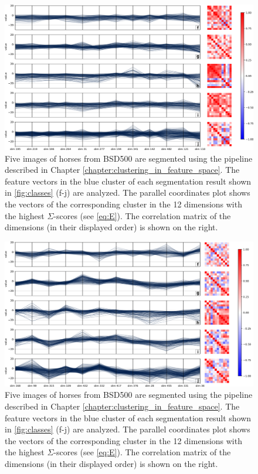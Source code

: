 \begin{figure}
    \centering
    \includegraphics[width=\textheight]{figures/PCP_similar2.png}
    \caption{Five images of horses from BSD500 are segmented using the pipeline described in Chapter \ref{chapter:clustering_in_feature_space}. The feature vectors in the blue cluster of each segmentation result shown in \autoref{fig:classes} (f-j) are analyzed. The parallel coordinates plot shows the vectors of the corresponding cluster in the 12 dimensions with the highest $\Sigma$-scores (see \autoref{eq:E}). The correlation matrix of the dimensions (in their displayed order) is shown on the right.}
    \label{fig:pcp_similar2}
\end{figure}

\begin{figure}
    \centering
    \includegraphics[width=\textheight]{figures/PCP_dissimilar2.png}
    \caption{Five images of horses from BSD500 are segmented using the pipeline described in Chapter \ref{chapter:clustering_in_feature_space}. The feature vectors in the blue cluster of each segmentation result shown in \autoref{fig:classes} (f-j) are analyzed. The parallel coordinates plot shows the vectors of the corresponding cluster in the 12 dimensions with the highest $\Sigma$-scores (see \autoref{eq:E}). The correlation matrix of the dimensions (in their displayed order) is shown on the right.}
    \label{fig:pcp_dissimilar2}
\end{figure}

